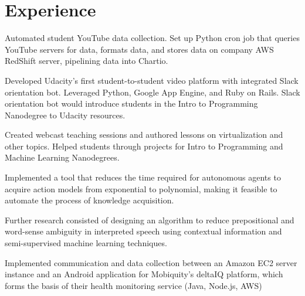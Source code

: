 \documentclass[]{deedy-resume-openfont}
\begin{document}
\hfill
\begin{minipage}[t]{0.66\textwidth} 


\section{Experience}

\vspace{\topsep} %
\begin{tightemize}
\item Automated student YouTube data collection. Set up Python cron job that queries YouTube servers for data, formats data, and stores data on company AWS RedShift server, pipelining data into Chartio. 

\item Developed Udacity's first student-to-student video platform with integrated Slack orientation bot. Leveraged Python, Google App Engine, and Ruby on Rails. Slack orientation bot would introduce students in the Intro to Programming Nanodegree to Udacity resources.

\item Created webcast teaching sessions and authored lessons on virtualization and other topics. Helped students through projects for Intro to Programming and Machine Learning Nanodegrees.
\end{tightemize}
\sectionsep

\begin{tightemize}
\item Implemented a tool that reduces the time required for autonomous agents to acquire action models from exponential to polynomial, making it feasible to automate the process of knowledge acquisition.

\item Further research consisted of designing an algorithm to reduce prepositional and word-sense ambiguity in interpreted speech using contextual information and semi-supervised machine learning techniques.
\end{tightemize}
\sectionsep

\begin{tightemize}
\item Implemented communication and data collection between an Amazon EC2 server instance and an Android application for Mobiquity’s deltaIQ platform, which forms the basis of their health monitoring service (Java, Node.js, AWS)


\end{tightemize}
\end{minipage}
\end{document}
